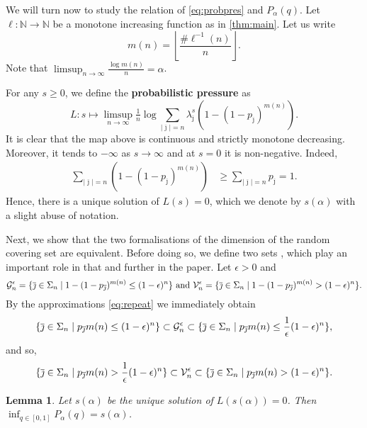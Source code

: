 \documentclass[12pt,]{article}
\newtheorem{lemma}[theorem]{Lemma}
\theoremstyle{definition}
\theoremstyle{remark}
\renewcommand{\Bbb}[1]{\mathbb{#1}}
\newcommand{\bbN}{{\Bbb N}}         %
\newcommand{\cG}{{\cal G}}
\newcommand{\cV}{{\cal V}}
\newcommand{\0}{\mathbf{0}}
\renewcommand{\le}{\leq}
\newcommand{\bj}{{\overline  {\jmath}}}
\begin{document}
We will turn now to study the relation of \cref{eq:probpres} and $P_\alpha(q)$. Let $\ell\colon\bbN\to\bbN$ be a monotone increasing function as in \cref{thm:main}. Let us write
\begin{equation}\label{eq:famousmn}
  m(n)=\left\lfloor \frac{\# \ell^{-1}(n)}{n} \right\rfloor.
\end{equation}
Note that $\limsup_{n\to\infty}\frac{\log m(n)}{n}=\alpha$.

For any $s\geq0$, we define the {\bf probabilistic pressure} as
$$
L\colon s\mapsto\limsup_{n\to \infty} \tfrac 1n \log \sum_{|\bj|=n}\lambda_{\bj}^{s}\left(1-(1-p_{\bj})^{m(n)}\right).
$$
It is clear that the map above is continuous and strictly monotone decreasing. Moreover, it tends to $-\infty$ as $s\to\infty$ and at $s=0$ it is non-negative. Indeed,
\[
  \begin{split}
    \sum_{|\bj|=n}\left(1-(1-p_{\bj})^{m(n)}\right)&\geq \sum_{|\bj|=n}p_{\bj}=1.
  \end{split}
\]
Hence, there is a unique solution of $L(s)=0$, which we denote by $s(\alpha)$ with a slight abuse of notation.

Next, we show that the two formalisations of the dimension of the random covering set are
equivalent. Before doing so, we define two sets , which play an important role in that and further
in the paper. Let $\epsilon>0$ and
\begin{equation}\label{eq:GV}
  \cG_n^\epsilon=\{\bj\in \Sigma_n\mid 1-(1-p_\bj)^{m(n)}\le (1-\epsilon)^n \} \text{ and
  }\cV_n^\epsilon=\{\bj\in \Sigma_n \mid 1-(1-p_\bj)^{m(n)}>(1-\epsilon)^n \}.
\end{equation}
By the approximations \eqref{eq:repeat} we immediately obtain
\begin{equation}\label{eq:setest}
  \{\bj\in \Sigma_n\mid p_{\bj}m(n)\le (1-\epsilon)^n\}\subset \cG_n^\epsilon \subset \{ \bj\in
  \Sigma_n\mid p_\bj m(n)\le \frac1\epsilon(1-\epsilon)^n \},
\end{equation}
and so,
\begin{equation}\label{eq:setest2}
  \{ \bj\in \Sigma_n\mid p_\bj m(n)> \frac1\epsilon(1-\epsilon)^n \}\subset \cV_n^\epsilon \subset
  \{\bj\in \Sigma_n\mid p_{\bj}m(n)> (1-\epsilon)^n\}.
\end{equation}




\begin{lemma}\label{thm:twospec}
  Let $s(\alpha)$ be the unique solution of $L(s(\alpha))=0$. Then $\inf_{q\in[0,1]}P_\alpha(q)=s(\alpha)$.
\end{lemma}
\end{document}
